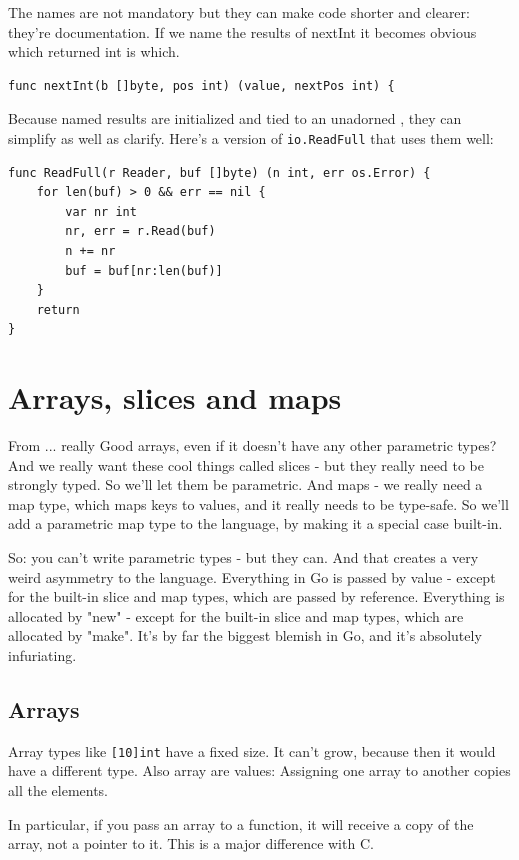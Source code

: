 The names are not mandatory but they can make code shorter and clearer: they're
documentation. If we name the results of nextInt it becomes obvious which
returned int is which.

\begin{lstlisting}
func nextInt(b []byte, pos int) (value, nextPos int) {
\end{lstlisting}
Because named results are initialized and tied to an unadorned
,
they can simplify as well as clarify. Here's a version of
\lstinline{io.ReadFull} that uses them well:

\begin{lstlisting}
func ReadFull(r Reader, buf []byte) (n int, err os.Error) {
    for len(buf) > 0 && err == nil {
        var nr int
        nr, err = r.Read(buf)
        n += nr
        buf = buf[nr:len(buf)]
    }
    return
}
\end{lstlisting}

\section{Arrays, slices and  maps}
From \cite{go_intro} ... really Good \draft{}
%
arrays, even if it doesn't have any other parametric types? And we really want
these cool things called slices - but they really need to be strongly typed. So
we'll let them be parametric. And maps - we really need a map type, which maps
keys to values, and it really needs to be type-safe. So we'll add a parametric
map type to the language, by making it a special case built-in.

So: you can't write parametric types - but they can. And that creates a very
weird asymmetry to the language. Everything in Go is passed by value - except
for the built-in slice and map types, which are passed by reference. Everything
is allocated by "new" - except for the built-in slice and map types, which are
allocated by "make". It's by far the biggest blemish in Go, and it's absolutely
infuriating.

\subsection{Arrays}
Array types like \lstinline{[10]int} have a fixed size. 
It can't grow, because then it would have a different type. Also array
are values: Assigning one array to another copies all the elements.

In particular, if you pass an array to a function, it will receive a
copy of the array, not a pointer to it. This is a major difference with
C.

